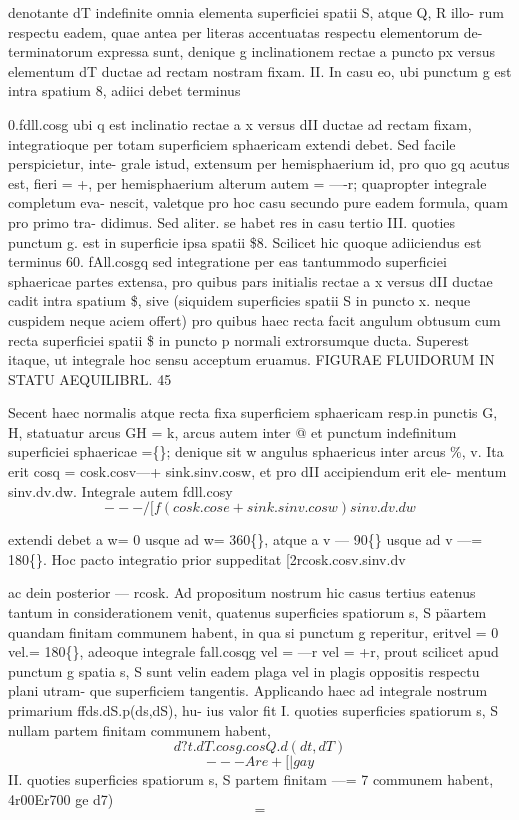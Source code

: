\documentclass[12pt,a4paper]{article}
\begin{document}
denotante         dT   indefinite omnia elementa superficiei spatii S, atque                 Q, R   illo-
rum respectu eadem, quae antea per literas accentuatas respectu elementorum de-
terminatorum expressa sunt, denique g inclinationem rectae a puncto px versus
elementum dT ductae ad rectam nostram fixam.
II. In casu eo, ubi punctum g est intra spatium 8, adiici debet terminus

0.fdll.cosg
ubi q est inclinatio rectae a x versus dII ductae ad rectam fixam, integratioque
per totam superficiem sphaericam extendi debet.     Sed facile perspicietur, inte-
grale istud, extensum per hemisphaerium id, pro quo gq acutus est, fieri = +,
per hemisphaerium alterum autem = ----r; quapropter integrale completum eva-
nescit, valetque pro hoc casu secundo pure eadem formula, quam pro primo tra-
didimus.    Sed aliter. se habet res in casu tertio
III. quoties punctum g. est in superficie ipsa spatii \$8.                  Scilicet hic quoque
adiiciendus est terminus
60. fAll.cosgq
sed integratione per eas tantummodo superficiei sphaericae partes extensa, pro
quibus pars initialis rectae a x versus dII ductae cadit intra spatium \$, sive
(siquidem superficies spatii S in puncto x. neque cuspidem neque aciem offert) pro
quibus haec recta facit angulum obtusum cum recta superficiei spatii \$ in puncto
p normali extrorsumque ducta. Superest itaque, ut integrale hoc sensu acceptum
eruamus.
FIGURAE FLUIDORUM IN STATU AEQUILIBRL.                          45

Secent haec normalis atque recta fixa superficiem sphaericam resp.in punctis
G, H, statuatur arcus GH = k, arcus autem inter @ et punctum indefinitum
superficiei sphaericae =\guillemotright\{\}; denique sit w angulus sphaericus inter arcus \%, v.
Ita erit cosq = cosk.cosv---+ sink.sinv.cosw, et pro dII accipiendum erit ele-
mentum        sinv.dv.dw.        Integrale autem fdll.cosy
\[                     --- /[f(cosk.cose+sink.sinv.cosw)sinv.dv.dw\]

extendi debet       a w=     0    usque ad      w=    360\textdegree\{\},   atque      a v --- 90\textdegree\{\}    usque ad
v ---= 180\textdegree\{\}.        Hoc pacto integratio prior suppeditat
[2rcosk.cosv.sinv.dv

ac dein posterior --- rcosk.
Ad propositum nostrum hic casus tertius eatenus tantum in considerationem
venit, quatenus superficies spatiorum           s, S päartem quandam finitam communem
habent, in qua si punctum g reperitur, eritvel = 0 vel.= 180\textdegree\{\}, adeoque
integrale fall.cosqg vel = ---r vel = +r, prout scilicet apud punctum g
spatia s, S sunt velin eadem plaga vel in plagis oppositis respectu plani utram-
que superficiem tangentis.
Applicando haec ad integrale nostrum primarium ffds.dS.p(ds,dS),                    hu-
ius valor fit
I.     quoties superficies spatiorum      s, S nullam partem finitam communem
habent,
\[                                              d?t.dT.cosg.cosQ.d(dt,dT)\]
\[                          --- Are         + [|        gay\]
II.     quoties superficies spatiorum      s, S partem finitam          ---= 7 communem
habent,
4r00Er700 ge                                    d7)
\[                      =\]
\end{document}
